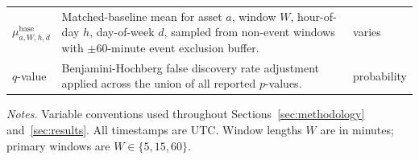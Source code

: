\begin{table}[!htbp]
\begin{threeparttable}
\begin{tabularx}{\textwidth}{lXl}
$\mu^{\text{base}}_{a,W,h,d}$ & Matched-baseline mean for asset $a$, window $W$, hour-of-day $h$, day-of-week $d$, sampled from non-event windows with $\pm 60$-minute event exclusion buffer. & varies \\[2pt]
$q$-value & Benjamini-Hochberg false discovery rate adjustment applied across the union of all reported $p$-values. & probability \\
\bottomrule
\end{tabularx}
\begin{tablenotes}
\footnotesize
\item \textit{Notes.} Variable conventions used throughout
Sections~\ref{sec:methodology} and~\ref{sec:results}. All
timestamps are UTC. Window lengths $W$ are in minutes; primary
windows are $W \in \{5, 15, 60\}$.
\end{tablenotes}
\end{threeparttable}
\end{table}
